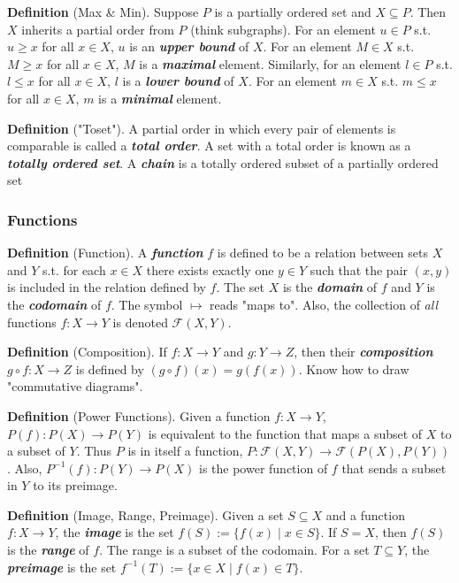 \textbf{Definition} (Max \& Min). Suppose $P$ is a partially ordered set and $X\subseteq P$. Then $X$ inherits a partial order from $P$ (think subgraphs). For an element $u\in P$ s.t. $u\geq x$ for all $x\in X$, $u$ is an \textbf{\textit{upper bound}} of $X$. For an element $M\in X$ s.t. $M\geq x$ for all $x\in X$, $M$ is a \textbf{\textit{maximal}} element. Similarly, for an element $l\in P$ s.t. $l\leq x$ for all $x\in X$, $l$ is a \textbf{\textit{lower bound}} of $X$. For an element $m\in X$ s.t. $m\leq x$ for all $x\in X$, $m$ is a \textbf{\textit{minimal}} element.

\textbf{Definition} ("Toset"). A partial order in which every pair of elements is comparable is called a \textbf{\textit{total order}}. A set with a total order is known as a \textbf{\textit{totally ordered set}}. A \textbf{\textit{chain}} is a totally ordered subset of a partially ordered set

\subsubsection{Functions}
\textbf{Definition} (Function). A \textbf{\textit{function}} $f$ is defined to be a relation between sets $X$ and $Y$ s.t. for each $x\in X$ there exists exactly one $y\in Y$ such that the pair $(x,y)$ is included in the relation defined by $f$. The set $X$ is the \textbf{\textit{domain}} of $f$ and $Y$ is the \textbf{\textit{codomain}} of $f$. The symbol $\mapsto$ reads "maps to". Also, the collection of \textit{all} functions $f:X\to Y$ is denoted $\mathcal{F}(X,Y)$.

\textbf{Definition} (Composition). If $f:X\to Y$ and $g:Y\to Z$, then their \textbf{\textit{composition}} $g\circ f:X\to Z$ is defined by $(g\circ f)(x)=g(f(x))$. Know how to draw "commutative diagrams".

\textbf{Definition} (Power Functions). Given a function $f:X\to Y$, $P(f):P(X)\to P(Y)$ is equivalent to the function that maps a subset of $X$ to a subset of $Y$. Thus $P$ is in itself a function, $P: \mathcal{F}(X,Y)\to \mathcal{F}(P(X),P(Y))$. Also, $P^{-1}(f):P(Y)\to P(X)$ is the power function of $f$ that sends a subset in $Y$ to its preimage.

\textbf{Definition} (Image, Range, Preimage). Given a set $S\subseteq X$ and a function $f:X\to Y$, the \textbf{\textit{image}} is the set $f(S):=\{f(x)\mid x\in S\}$. If $S=X$, then $f(S)$ is the \textbf{\textit{range}} of $f$. The range is a subset of the codomain. For a set $T\subseteq Y$, the \textbf{\textit{preimage}} is the set $f^{-1}(T):=\{x\in X\mid f(x)\in T\}$. 

